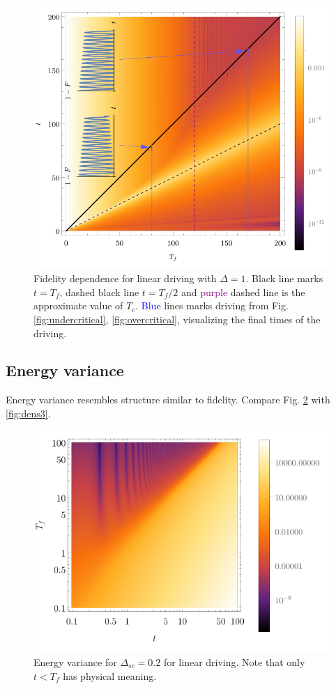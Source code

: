 \begin{figure}[H]
    \centering 
    \includegraphics[scale=1.2]{../img/allInOne.pdf}
    \caption{Fidelity dependence for linear driving with $\Delta=1$. Black line marks $t=T_f$, dashed black line $t=T_f/2$ and \textcolor{purple}{purple} dashed line is the approximate value of $T_c$. \textcolor{blue}{Blue} lines marks driving from Fig. \ref{fig:undercritical}, \ref{fig:overcritical}, visualizing the final times of the driving.}
    \label{fig:AllInOne}
\end{figure}


\newpage
\subsection{Energy variance}
Energy variance resembles structure similar to fidelity. Compare Fig. \ref{fig:densVariance} with \ref{fig:dens3}. 
\begin{figure}[H]
    \centering
    \includegraphics[scale=1.2]{../img/densVariance.pdf}
    \caption{Energy variance for $\Delta_{sc}=0.2$ for linear driving. Note that only $t<T_f$ has physical meaning.}
    \label{fig:densVariance}
\end{figure}

